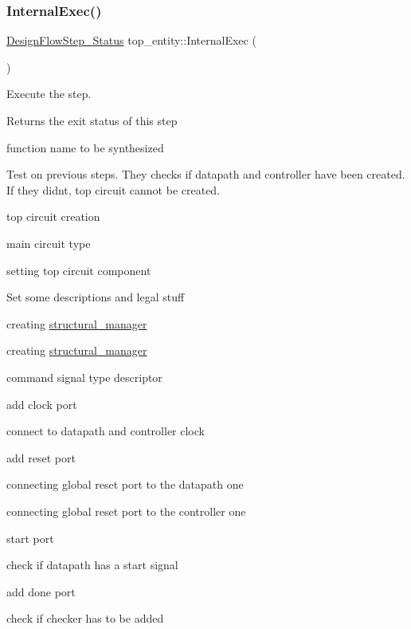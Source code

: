 \mbox{\label{classtop__entity_ae3b1c2be3024a1f3abfe3066d8db12fb}} 
\subsubsection{\texorpdfstring{Internal\+Exec()}{InternalExec()}}
{\footnotesize\ttfamily \hyperlink{design__flow__step_8hpp_afb1f0d73069c26076b8d31dbc8ebecdf}{Design\+Flow\+Step\+\_\+\+Status} top\+\_\+entity\+::\+Internal\+Exec (\begin{DoxyParamCaption}{ }\end{DoxyParamCaption})\hspace{0.3cm}{\ttfamily [virtual]}}



Execute the step. 

\begin{DoxyReturn}{Returns}
the exit status of this step 
\end{DoxyReturn}
function name to be synthesized

Test on previous steps. They checks if datapath and controller have been created. If they didn\textquotesingle{}t, top circuit cannot be created.

top circuit creation

main circuit type

setting top circuit component

Set some descriptions and legal stuff

creating \hyperlink{classstructural__manager}{structural\+\_\+manager}

creating \hyperlink{classstructural__manager}{structural\+\_\+manager}

command signal type descriptor

add clock port

connect to datapath and controller clock

add reset port

connecting global reset port to the datapath one

connecting global reset port to the controller one

start port

check if datapath has a start signal

add done port

check if checker has to be added

